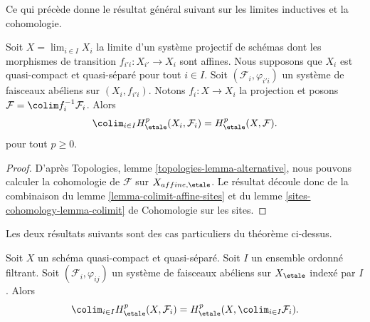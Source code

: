 \noindent
Ce qui pr\'ec\`ede donne le r\'esultat g\'en\'eral suivant sur les limites inductives et la cohomologie.

\begin{theorem}
\label{theorem-colimit}
Soit $X = \lim_{i \in I} X_i$ la limite d'un syst\`eme projectif de sch\'emas
dont les morphismes de transition $f_{i'i} : X_{i'} \to X_i$ sont affines. Nous supposons
que $X_i$ est quasi-compact et quasi-s\'epar\'e pour tout $i \in I$.
Soit $(\mathcal{F}_i, \varphi_{i'i})$ un syst\`eme de faisceaux ab\'eliens
sur $(X_i, f_{i'i})$. Notons $f_i : X \to X_i$ la projection et posons
$\mathcal{F} = \colim f_i^{-1}\mathcal{F}_i$. Alors
$$
\colim_{i\in I} H_\etale^p(X_i, \mathcal{F}_i) = H_\etale^p(X, \mathcal{F}).
$$
pour tout $p \geq 0$.
\end{theorem}

\begin{proof}
D'apr\`es Topologies, lemme \ref{topologies-lemma-alternative},
nous pouvons calculer la cohomologie
de $\mathcal{F}$ sur $X_{affine, \etale}$.
Le r\'esultat d\'ecoule donc de la combinaison du
lemme \ref{lemma-colimit-affine-sites}
et du
lemme \ref{sites-cohomology-lemma-colimit} de Cohomologie sur les sites.
\end{proof}

\noindent
Les deux r\'esultats suivants sont des cas particuliers du th\'eor\`eme ci-dessus.

\begin{lemma}
\label{lemma-colimit}
Soit $X$ un sch\'ema quasi-compact et quasi-s\'epar\'e. Soit $I$
un ensemble ordonn\'e filtrant. Soit $(\mathcal{F}_i, \varphi_{ij})$ un syst\`eme
de faisceaux ab\'eliens sur $X_\etale$ index\'e par $I$. Alors
$$
\colim_{i\in I} H_\etale^p(X, \mathcal{F}_i) = H_\etale^p(X,
\colim_{i\in I} \mathcal{F}_i).
$$
\end{lemma}

